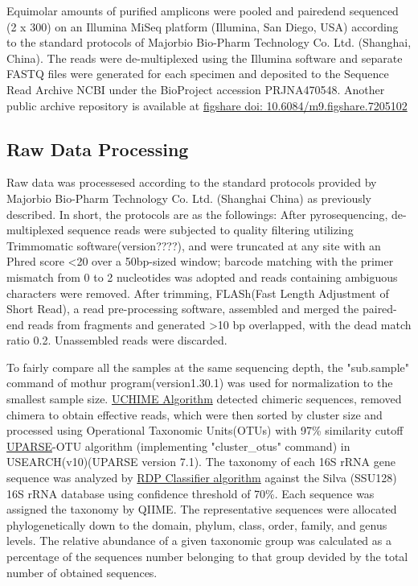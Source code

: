 \documentclass[fleqn,10pt,lineno]{wlpeerj} %
\begin{document}
  \noindent
  Equimolar amounts of purified amplicons were pooled and paired\-end sequenced (2 x 300) on an Illumina MiSeq platform (Illumina, San Diego, USA) according to the standard protocols of Majorbio Bio-Pharm Technology Co. Ltd. (Shanghai, China). The reads were de-multiplexed using the Illumina software and separate FASTQ files were generated for each specimen and deposited to the Sequence Read Archive NCBI under the BioProject accession PRJNA470548. Another public archive repository is available at \href{https://figshare.com/articles/Untitled_Item192_samples_for_publishing_Longitudinal_gut_microbiota_patterns_in_preterm_infants_with_necrotizing_enterocolitis_or_late-onset_sepsis_an_observational_prospective_study_/7205102}{figshare doi: 10.6084/m9.figshare.7205102}

  \subsection*{Raw Data Processing}
  Raw data was processesed according to the standard protocols provided by Majorbio Bio-Pharm Technology Co. Ltd. (Shanghai China) as previously described\citep{liu2018splenectomy, wang2018bacterial}. In short, the protocols are as the followings:
  After pyrosequencing, de-multiplexed sequence reads were subjected to quality filtering utilizing Trimmomatic software(version????)\citep{bolger2014trimmomatic},  and were truncated at any site with an Phred score \textless 20 over a 50bp-sized window; barcode matching with the primer mismatch from 0 to 2 nucleotides was adopted and reads containing ambiguous characters were removed. After trimming, FLASh(Fast Length Adjustment of Short Read)\citep{magovc2011flash}, a read pre-processing software, assembled and merged the paired-end reads from fragments and generated \textgreater 10 bp overlapped, with the dead match ratio 0.2. Unassembled reads were discarded.

  \noindent
  To fairly compare all the samples at the same sequencing depth, the "sub.sample" command of mothur program(version1.30.1)\citep{schloss2009introducing} was used for normalization to the smallest sample size. \href{https://www.drive5.com/usearch/manual/uchime_algo.html}{UCHIME Algorithm} detected chimeric sequences, removed chimera to obtain effective reads, which were then sorted by cluster size and processed using Operational Taxonomic Units(OTUs) with 97\% similarity cutoff \href{http://drive5.com/uparse/}{UPARSE}-OTU algorithm (implementing "cluster\_otus" command)\citep{edgar2013uparse} in USEARCH(v10)(UPARSE version 7.1). The taxonomy of each 16S rRNA gene sequence was analyzed by \href{http://rdp.cme.msu.edu/}{RDP Classifier algorithm}\citep{wang2007naive} against the Silva (SSU128)\citep{quast2012silva} 16S rRNA database using confidence threshold of 70\%. Each sequence was assigned the taxonomy by QIIME\citep{caporaso2010qiime}. The representative sequences were allocated phylogenetically down to the domain, phylum, class, order, family, and genus levels. The relative abundance of a given taxonomic group was calculated as a percentage of the sequences number belonging to that group devided by the total number of obtained sequences.
\end{document}
